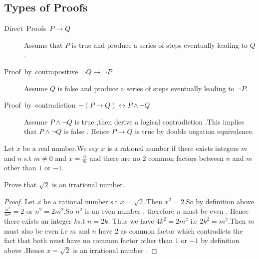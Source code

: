 \documentclass[a4paper,english,12pt]{article}
\begin{document}
\subsection{Types of Proofs }
\begin{description}
\item [{Direct~Proofs~$P\rightarrow Q$}] Assume that $P$ is true and
produce a series of steps eventually leading to $Q$.
\item [{Proof~by~contrapositive~$\lnot Q\rightarrow\lnot P$}] Assume
$Q$ is false and produce a series of steps eventually leading to
$\lnot P$.
\item [{Proof~by~contradiction~$\lnot(P\rightarrow Q)\leftrightarrow P\wedge\lnot Q$}] Assume
$P\wedge\lnot Q$ is true ,then derive a logical contradiction .This
implies that $P\wedge\lnot Q$ is false . Hence $P\rightarrow Q$
is true by double negation equivalence.\end{description}


\begin{defn} Let $x$ be a real number.We say $x$ is a rational number
if there exists integers $m$ and $n$ s.t $m\ne0$ and $x=\frac{n}{m}$
and there are no 2 common factors between $n$ and $m$ other than
$1$ or $-1$.
\end{defn}

\begin{thm} Prove that $\sqrt{2}$ is an irrational number.
\end{thm}

 
\begin{proof} Let $x$ be a rational number s.t $x=\sqrt{2}$.Then $x^{2}=2$.So
by definition above $\frac{n^{2}}{m^{2}}=2$ or $n^{2}=2m^{2}$.So
$n^{2}$ is an even number , therefore $n$ must be even . Hence there
exists an integer $k$s.t $n=2k$. Thus we have $4k^{2}=2m^{2}$ i.e
$2k^{2}=m^{2}$.Then $m$ must also be even i.e $m$ and $n$ have
$2$ as common factor which contradicts the fact that both must have
no common factor other than $1$ or $-1$ by definition above .Hence
$x=\sqrt{2}$ is an irrational number .
\end{proof}
\end{document}
